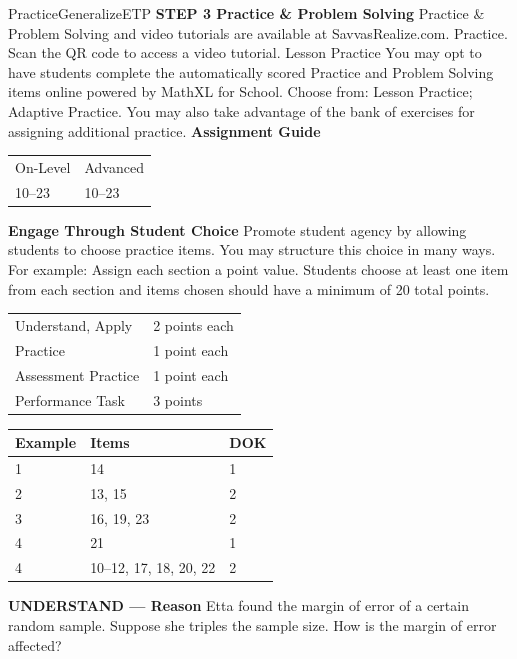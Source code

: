 \documentclass{article}
\newenvironment{item-analysis}{}{}      %
\newenvironment{practice}[2]{}{}        %
\newenvironment{te-addendum}[2]{}{}     %
\newcommand{\answer}[1]{}               %
\begin{document}
\begin{te-addendum}{Practice}{GeneralizeETP}
\textbf{STEP 3 Practice & Problem Solving}
Practice & Problem Solving and video tutorials are available at SavvasRealize.com. Practice. Scan the QR code to access a video tutorial.
Lesson Practice You may opt to have students complete the automatically scored Practice and Problem Solving items online powered by MathXL for School.
Choose from: Lesson Practice; Adaptive Practice.
You may also take advantage of the bank of exercises for assigning additional practice.
\textbf{Assignment Guide}
\begin{tabular}{ll}
On-Level & Advanced \\
10–23 & 10–23 \\
\end{tabular}
\textbf{Engage Through Student Choice}
Promote student agency by allowing students to choose practice items. You may structure this choice in many ways. For example:
Assign each section a point value. Students choose at least one item from each section and items chosen should have a minimum of 20 total points.
\begin{tabular}{ll}
Understand, Apply & 2 points each \\
Practice & 1 point each \\
Assessment Practice & 1 point each \\
Performance Task & 3 points \\
\end{tabular}
\end{te-addendum}
\begin{item-analysis}
\begin{tabular}{lll}
\toprule
Example & Items & DOK \\
\midrule
1 & 14 & 1 \\
2 & 13, 15 & 2 \\
3 & 16, 19, 23 & 2 \\
4 & 21 & 1 \\
4 & 10--12, 17, 18, 20, 22 & 2 \\
\bottomrule
\end{tabular}
\end{item-analysis}
\begin{practice}{10}{2}
\textbf{UNDERSTAND — Reason} Etta found the margin of error of a certain random sample. Suppose she triples the sample size. How is the margin of error affected?
\answer{Tripling a sample size means that the margin of error is multiplied by (\frac{1}{\sqrt{3}}), or about 0.58. This means the margin of error is about 58\% of its original value.}
\end{practice}
\end{document}
